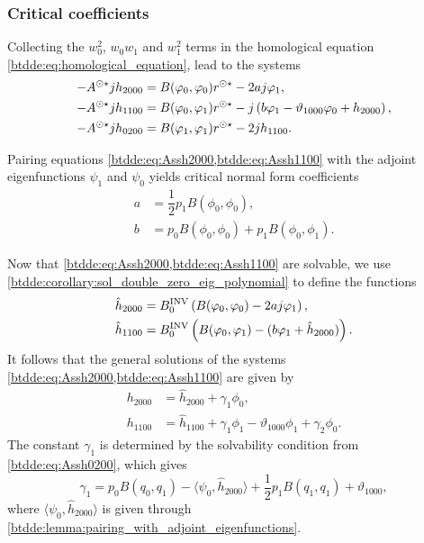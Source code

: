 \subsubsection{Critical coefficients}
\label{btdde:sec:critical_coefficients}
Collecting the $w_0^2$, $w_0w_1$ and $w_1^2$ terms in the homological equation \cref{btdde:eq:homological_equation},
lead to the systems
\begin{align}
-A^{\odot\star} jh_{2000} & =  B(\varphi_0,\varphi_0)r^{\odot\star} - 2aj\varphi_1 , \label{btdde:eq:Assh2000}\\
-A^{\odot\star} jh_{1100} & =  B(\varphi_0,\varphi_1)r^{\odot\star} - j\left(b\varphi_1 - \vartheta_{1000} \varphi_0 + h_{2000}\right), \label{btdde:eq:Assh1100} \\
-A^{\odot\star} jh_{0200} & =  B(\varphi_1,\varphi_1)r^{\odot\star} - 2j h_{1100}. \label{btdde:eq:Assh0200}
\end{align}

Pairing equations \cref{btdde:eq:Assh2000,btdde:eq:Assh1100} with the adjoint
eigenfunctions $\psi_1$ and $\psi_0$ yields critical normal form coefficients
\begin{align*}
a & = \dfrac{1}{2}p_1B(\phi_0,\phi_0),\\
b & = p_0B(\phi_0,\phi_0) + p_1B(\phi_0,\phi_1).
\end{align*}

Now that \cref{btdde:eq:Assh2000,btdde:eq:Assh1100} are solvable, we use
\cref{btdde:corollary:sol_double_zero_eig_polynomial} to define the functions
\begin{align*}
\hat h_{2000} & = B^{\mathrm{INV}}_{0} \left( B(\varphi_0,\varphi_0) - 2aj\varphi_1 \right), \\
\hat h_{1100} & = B^{\mathrm{INV}}_{0} \left( B(\varphi_0,\varphi_1) - (b\varphi_1 + \hat h_{2000}) \right).
\end{align*}
It follows that the general solutions of the systems \cref{btdde:eq:Assh2000,btdde:eq:Assh1100}
are given by
\begin{align*}
h_{2000} &= \hat h_{2000} + \gamma_1 \phi_0, \\
h_{1100} &= \hat h_{1100} + \gamma_1 \phi_1 - \vartheta_{1000} \phi_1 + \gamma_2 \phi_0.
\end{align*}
The constant $\gamma_1$ is determined by the solvability condition from \cref{btdde:eq:Assh0200}, which gives
\begin{equation*}
\gamma_1 = p_0  B(q_0,q_1) - \langle \psi_0, \hat h_{2000} \rangle 
								+ \frac12 p_1 B(q_1,q_1) + \vartheta_{1000},
\end{equation*}
where $\langle \psi_0,\hat h_{2000}\rangle$ is given through \cref{btdde:lemma:pairing_with_adjoint_eigenfunctions}.

